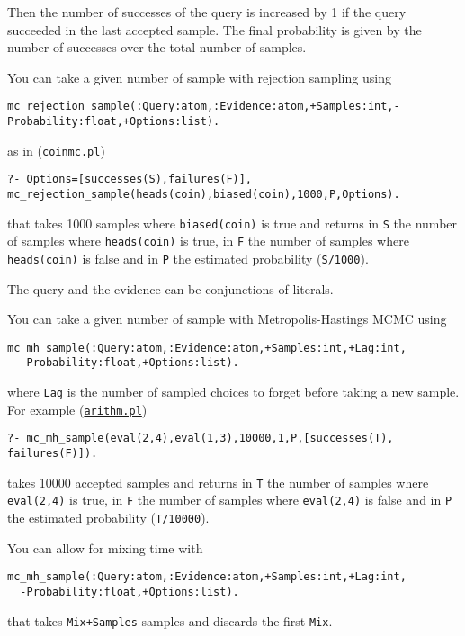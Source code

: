Then the number of successes of the query is increased by 1 if the query succeeded in the last accepted
sample. The final probability is given by the number of successes over the total
number of samples.

You can take a given number of sample with rejection sampling using
\begin{verbatim}
mc_rejection_sample(:Query:atom,:Evidence:atom,+Samples:int,-Probability:float,+Options:list).
\end{verbatim}
as in (\href{http://cplint.ml.unife.it/example/inference/coinmc.pl}{\texttt{coinmc.pl}})
\begin{verbatim}
?- Options=[successes(S),failures(F)], mc_rejection_sample(heads(coin),biased(coin),1000,P,Options).
\end{verbatim}
that takes 1000 samples where \verb|biased(coin)| is true and returns in \verb|S| the number of samples where
\verb|heads(coin)| is true, in \verb|F| the number of samples where \verb|heads(coin)| is false and in \verb|P| the
estimated probability (\verb|S/1000|).

The query and the evidence can be conjunctions of literals.

You can take a given number of sample with Metropolis-Hastings MCMC using
\begin{verbatim}
mc_mh_sample(:Query:atom,:Evidence:atom,+Samples:int,+Lag:int,
  -Probability:float,+Options:list).
\end{verbatim}
where \verb|Lag| is the number of sampled choices to forget before taking a new sample.
For example (\href{http://cplint.ml.unife.it/example/inference/arithm.pl}{\texttt{arithm.pl}})
\begin{verbatim}
?- mc_mh_sample(eval(2,4),eval(1,3),10000,1,P,[successes(T), failures(F)]).
\end{verbatim}
takes 10000 accepted samples and returns in \verb|T| the number of samples where
\verb|eval(2,4)| is true, in \verb|F| the number of samples where \verb|eval(2,4)| is false and in \verb|P| the
estimated probability (\verb|T/10000|).

You can allow for mixing time with
\begin{verbatim}
mc_mh_sample(:Query:atom,:Evidence:atom,+Samples:int,+Lag:int,
  -Probability:float,+Options:list).
\end{verbatim}
that takes \verb|Mix+Samples| samples and discards the first \verb|Mix|.


